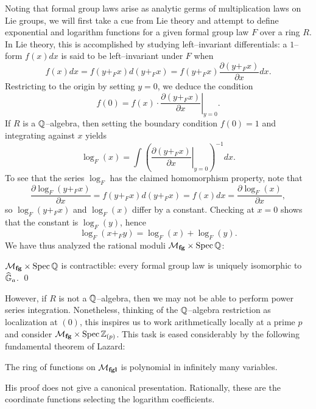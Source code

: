 Noting that formal group laws arise as analytic germs of multiplication laws on Lie groups, we will first take a cue from Lie theory and attempt to define exponential and logarithm functions for a given formal group law $F$ over a ring $R$.  In Lie theory, this is accomplished by studying left--invariant differentials: a $1$--form $f(x) dx$ is said to be left--invariant under $F$ when \[f(x) dx = f(y +_F x) d(y +_F x) = f(y +_F x) \frac{\partial(y +_F x)}{\partial x} dx.\]  Restricting to the origin by setting $y = 0$, we deduce the condition \[f(0) = f(x) \cdot \left. \frac{\partial(y +_F x)}{\partial x} \right|_{y=0}.\]  If $R$ is a $\mathbb{Q}$--algebra, then setting the boundary condition $f(0) = 1$ and integrating against $x$ yields \[\log_F(x) = \int \left( \left. \frac{\partial(y +_F x)}{\partial x} \right|_{y=0} \right)^{-1} dx.\]  To see that the series $\log_F$ has the claimed homomorphism property, note that \[\frac{\partial \log_F(y +_F x)}{\partial x} = f(y +_F x) d(y +_F x) = f(x) dx = \frac{\partial \log_F(x)}{\partial x},\] so $\log_F(y +_F x)$ and $\log_F(x)$ differ by a constant.  Checking at $x = 0$ shows that the constant is $\log_F(y)$, hence \[\log_F(x +_F y) = \log_F(x) + \log_F(y).\]  We have thus analyzed the rational moduli $\mathcal{M}_{\mathbf{fg}} \times \operatorname{Spec} \mathbb{Q}$:
\begin{theorem}
$\mathcal{M}_{\mathbf{fg}} \times \operatorname{Spec} \mathbb{Q}$ is contractible: every formal group law is uniquely isomorphic to $\widehat{\mathbb G}_a$. \qed {}
\end{theorem}

However, if $R$ is not a $\mathbb{Q}$--algebra, then we may not be able to perform power series integration.  Nonetheless, thinking of the $\mathbb{Q}$--algebra restriction as localization at $(0)$, this inspires us to work arithmetically locally at a prime $p$ and consider $\mathcal{M}_{\mathbf{fg}} \times \operatorname{Spec} \mathbb Z_{(p)}$.  This task is eased considerably by the following fundamental theorem of Lazard:

\begin{theorem}
The ring of functions on $\mathcal{M}_{\mathbf{fgl}}$ is polynomial in infinitely many variables.
\end{theorem}

\begin{remark}
His proof does not give a canonical presentation.  Rationally, these are the coordinate functions selecting the logarithm coefficients.
\end{remark}

